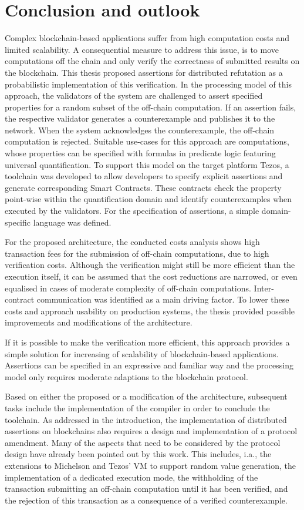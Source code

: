 \chapter{Conclusion and outlook}\label{chap:conclusion}
Complex blockchain-based applications suffer from high computation costs and limited scalability. A consequential measure to address this issue, is to move computations off the chain and only verify the correctness of submitted results on the blockchain. This thesis  proposed assertions for distributed refutation as a probabilistic implementation of this verification. In the processing model of this approach, the validators of the system are challenged to assert specified properties for a random subset of the off-chain computation. If an assertion fails, the respective validator generates a counterexample and publishes it to the network. When the system acknowledges the counterexample, the off-chain computation is rejected. Suitable use-cases for this approach are computations, whose properties can be specified with formulas in predicate logic featuring universal quantification. To support this model on the target platform Tezos, a toolchain was developed to allow developers to specify explicit assertions and generate corresponding Smart Contracts. These contracts check the property point-wise within the quantification domain and identify counterexamples when executed by the validators. For the specification of assertions, a simple domain-specific language was defined.

For the proposed architecture, the conducted costs analysis shows high transaction fees for the submission of off-chain computations,  due to high verification costs. Although the verification might still be more efficient than the execution itself, it can be assumed that the cost reductions are narrowed, or even equalised in cases of moderate complexity of off-chain computations. Inter-contract communication was identified as a main driving factor. To lower these costs and approach usability on production systems, the thesis provided possible improvements and modifications of the architecture.

If it is possible to make the verification more efficient, this approach provides a simple solution for increasing of scalability of blockchain-based applications. Assertions can be specified in an expressive and familiar way and the processing model only requires moderate adaptions to the blockchain protocol.

Based on either the proposed or a modification of the architecture, subsequent tasks include the implementation of the compiler in order to conclude the toolchain. As addressed in the introduction, the implementation of distributed assertions on blockchains also requires a design and implementation of a protocol amendment. Many of the aspects that need to be considered by the protocol design have already been pointed out by this work. This includes, i.a., the extensions to Michelson and Tezos' VM to support random value generation, the implementation of a dedicated execution mode, the withholding of the transaction submitting an off-chain computation until it has been verified, and the rejection of this transaction as a consequence of a verified counterexample. 

